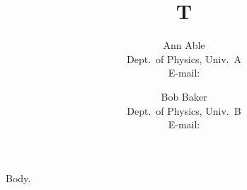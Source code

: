 \documentclass{JHEP3}
\title{T}
\author{Ann Able\\
  Dept.\ of Physics, Univ.\ A\\
  E-mail: \email{ann@a.edu}}
\author{Bob Baker\\
  Dept.\ of Physics, Univ.\ B\\
  E-mail: \email{bob@b.edu}}
\begin{document}
Body.
\end{document}

